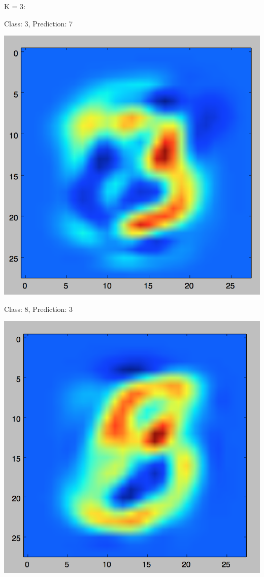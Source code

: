 \documentclass[11pt]{article}
\begin{document}
K = 3:

Class: 3, Prediction: 7

\includegraphics[scale=.3]{images/knn3_3_7.png}

Class: 8, Prediction: 3

\includegraphics[scale=.3]{images/knn3_8_3.png}
\end{document}
